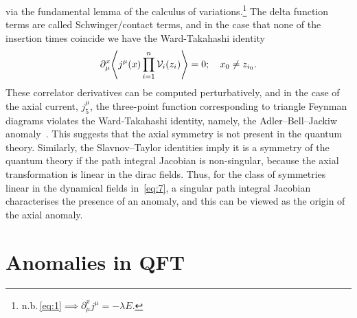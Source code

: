 \documentclass[11pt, a4paper]{article}
\begin{document}
via the fundamental lemma of the
calculus of variations.\footnote{n.b.\,\eqref{eq:1}$ \implies \partial^x_\mu j^\mu = -\lambda E$.}
The delta function terms are called Schwinger/contact terms, 
and in the case that none of the insertion times coincide we have 
the Ward-Takahashi identity~\cite{WardWTI,TakahashiWTI}
\begin{equation}
  \partial^x_{\mu}\!\Braket{j^\mu(x)\prod^n_{i=1}{\mathcal{V}_i(z_i)}} = 0;
  \quad x_0 \neq z_{i_0}.
\end{equation}
These correlator derivatives can be computed perturbatively, and in the case
of the axial current, $j^\mu_5$, the three-point function corresponding
to triangle Feynman diagrams violates the Ward-Takahashi identity, namely,
the Adler–Bell–Jackiw anomaly~\cite{Adler,Bell-Jackiw}.
This suggests that the axial symmetry is not present in the quantum theory.
Similarly, the Slavnov–Taylor identities imply it is a symmetry of
the quantum theory if the path integral Jacobian is non-singular,
because the axial transformation is linear in the dirac fields.
Thus, for the class of symmetries linear in the dynamical fields
in~\eqref{eq:7}, a singular path integral Jacobian
characterises the presence of an anomaly, and this can be viewed
as the origin of the axial anomaly.

\section{Anomalies in QFT}
\end{document}
